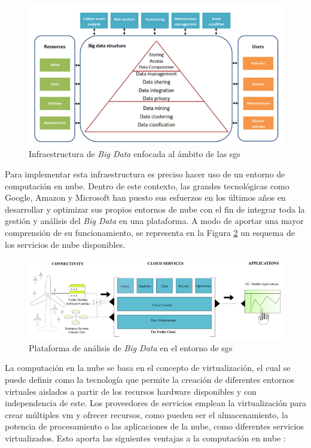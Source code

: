 \begin{figure}[h!]
  \centering
  \includegraphics[width=1\textwidth]{img/teoria/bigdata2.png}
  \caption{Infraestructura de \textit{Big Data} enfocada al ámbito de las \gls{sg}s \cite{stab}}
  \label{fig:bigdata2}
\end{figure}

Para implementar esta infraestructura es preciso hacer uso de un entorno de computación en nube. Dentro de este contexto, las grandes tecnológicas como Google, Amazon y Microsoft han puesto sus esfuerzos en los últimos años en desarrollar y optimizar sus propios entornos de nube con el fin de integrar toda la gestión y análisis del \textit{Big Data} en una plataforma. A modo de aportar una mayor comprensión de su funcionamiento, se representa en la Figura \ref{fig:bigdata} un esquema de los servicios de nube disponibles.

\begin{figure}[h!]
  \centering
  \includegraphics[width=1\textwidth]{img/teoria/bigdata.png}
  \caption{Plataforma de análisis de \textit{Big Data} en el entorno de \gls{sg}s \cite{bigdata}}
  \label{fig:bigdata}
\end{figure}

\vspace{3mm}

La computación en la nube se basa en el concepto de virtualización, el cual se puede definir como la tecnología que permite la creación de diferentes entornos virtuales aislados a partir de los recursos hardware disponibles y con independencia de este. Los proveedores de servicios emplean la virtualización para crear múltiples \gls{vm} y ofrecer recursos, como pueden ser el almacenamiento, la potencia de procesamiento o las aplicaciones de la nube, como diferentes servicios virtualizados. Esto aporta las siguientes ventajas a la computación en nube \cite{bigdata} \cite{virt}:

